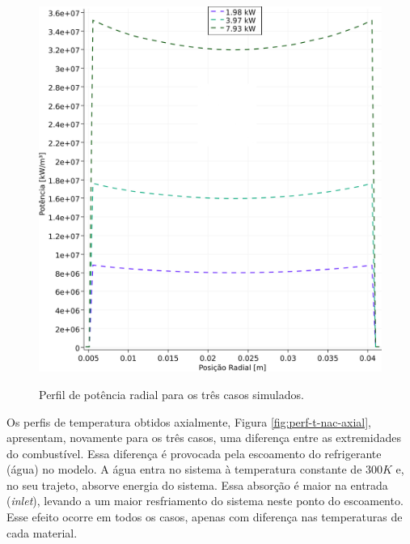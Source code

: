 \begin{figure}[htb]
  \caption[Perfil de potência radial para os três casos simulados.]{Perfil de potência radial para os três casos simulados.}
  \centering\includegraphics[scale=0.5]{figuras/Q_x_NC_square_port.png}
  \label{fig:perf-Q-nac-radial}
\end{figure}

Os perfis de temperatura obtidos axialmente, Figura \ref{fig:perf-t-nac-axial},
apresentam, novamente para os três casos, uma diferença entre as extremidades
do combustível. Essa diferença é provocada pela escoamento do refrigerante (água) no
modelo. A água entra no sistema à temperatura constante de $300 K$ e, no seu trajeto,
absorve energia do sistema. Essa absorção é maior na entrada (\textit{inlet}),
levando a um maior resfriamento do sistema neste ponto do escoamento. Esse efeito
ocorre em todos os casos, apenas com diferença nas temperaturas de cada material.

